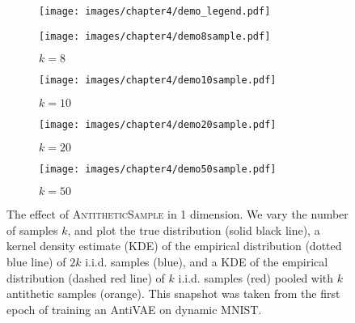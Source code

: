 \begin{figure}[h!]
    \centering
    \begin{subfigure}[b]{\columnwidth}
        \texttt{[image: images/chapter4/demo\_legend.pdf]}
    \end{subfigure}
    \begin{subfigure}[b]{.24\columnwidth}
        \texttt{[image: images/chapter4/demo8sample.pdf]}
        \caption{$k=8$}
        \label{fig:demo8}
    \end{subfigure}
    \begin{subfigure}[b]{.24\columnwidth}
        \texttt{[image: images/chapter4/demo10sample.pdf]}
        \caption{$k=10$}
        \label{fig:demo10}
    \end{subfigure}
    \begin{subfigure}[b]{.24\columnwidth}
        \texttt{[image: images/chapter4/demo20sample.pdf]}
        \caption{$k=20$}
        \label{fig:demo20}
    \end{subfigure}
    \begin{subfigure}[b]{.24\columnwidth}
        \texttt{[image: images/chapter4/demo50sample.pdf]}
        \caption{$k=50$}
        \label{fig:demo50}
    \end{subfigure}
    \caption{The effect of \textsc{AntitheticSample} in 1 dimension. We vary the number of samples $k$, and plot the true distribution (solid black line), a kernel density estimate (KDE) of the empirical distribution (dotted blue line) of $2k$ i.i.d. samples (blue), and a KDE of the empirical distribution (dashed red line) of $k$ i.i.d. samples (red) pooled with $k$ antithetic samples (orange).
    This snapshot was taken from the first epoch of training an AntiVAE on dynamic MNIST.}

    \label{fig:demo}
\end{figure}

